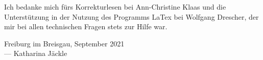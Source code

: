 Ich bedanke mich fürs Korrekturlesen bei Ann-Christine Klaas und die Unterstützung in der
Nutzung des Programms LaTex bei Wolfgang Drescher, der mir bei allen technischen Fragen
stets zur Hilfe war. 




\vspace{0.5cm}

\begin{flushright}
	{
		\small
		Freiburg im Breisgau, September 2021\\
		--- Katharina Jäckle
	}
\end{flushright}
